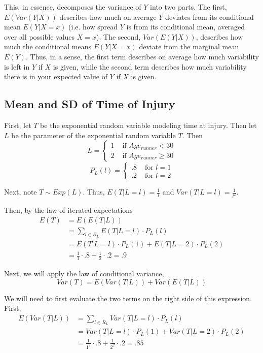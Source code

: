 \documentclass[paper=a4, fontsize=11pt]{scrartcl} %
\numberwithin{equation}{section} %
\numberwithin{figure}{section} %
\numberwithin{table}{section} %
\begin{document}
This, in essence, decomposes the variance of $Y$ into two parts. The first, $E(Var(Y|X))$ describes how much on average $Y$ deviates from its conditional mean $E(Y | X=x)$ (i.e. how spread $Y$ is from its conditional mean, averaged over all possible values $X = x$). The second, $Var(E(Y|X))$, describes how much the conditional means $E( Y | X=x)$ deviate from the marginal mean $E(Y)$. Thus, in a sense, the first term describes on average how much variability is left in $Y$ if $X$ is given, while the second term describes how much variability there is in your expected value of $Y$ if $X$ is given.

\subsection{Mean and SD of Time of Injury}

First, let $T$ be the exponential random variable modeling time at injury. Then let $L$ be the parameter of the exponential random variable $T$. Then
\[
L = 
\begin{cases}
   1 & \textrm{ if } Age_{runner}  < 30 \\
   2 & \textrm{ if } Age_{runner} \geq 30
\end{cases}
\]
\[
P_L(l) = 
\begin{cases}
   .8 & \textrm{ for } l = 1 \\
   .2 & \textrm{ for } l = 2
\end{cases}
\]

Next, note $T \sim Exp(L)$. Thus, $E(T | L=l) = \frac{1}{l}$ and $Var(T | L=l) = \frac{1}{l^2}$.

Then, by the law of iterated expectations
\begin{align*}
E(T) &= E(E(T | L))\\
   &= \sum_{l \in R_L} E(T | L = l) \cdot P_L(l)\\
   &= E(T | L = l) \cdot P_L(1) + E(T | L = 2) \cdot P_L(2)\\
   &= \frac{1}{1} \cdot .8 + \frac{1}{2} \cdot .2 = .9
\end{align*}

Next, we will apply the law of conditional variance,
\begin{equation*}
Var(T) = E(Var(T|L)) + Var(E(T|L))
\end{equation*}

We will  need to first evaluate the two terms on the right side of this expression. First, 
\begin{align*}
E(Var(T | L)) &= \sum_{l \in R_L} Var(T | L = l) \cdot P_L(l)\\
   &= Var(T | L = l) \cdot P_L(1) + Var(T | L = 2) \cdot P_L(2)\\
   &= \frac{1}{1^2} \cdot .8 + \frac{1}{2^2} \cdot .2 = .85
\end{align*}
\end{document}
